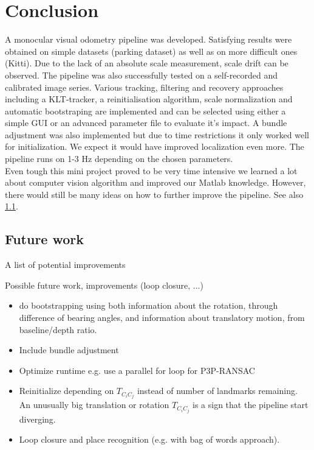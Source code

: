 \section{Conclusion}
A monocular visual odometry pipeline was developed. Satisfying results were obtained on simple datasets (parking dataset) as well as on more difficult ones (Kitti). Due to the lack of an absolute scale measurement, scale drift can be observed. The pipeline was also successfully tested on a self-recorded and calibrated image series. Various tracking, filtering and recovery approaches including a KLT-tracker, a reinitialisation algorithm, scale normalization and automatic bootstraping are implemented and can be selected using either a simple GUI or an advanced parameter file to evaluate it's impact. A bundle adjustment was also implemented but due to time restrictions it only worked well for initialization. We expect it would have improved localization even more. The pipeline runs on 1-3 Hz depending on the chosen parameters.\\

Even tough this mini project proved to be very time intensive we learned a lot about computer vision algorithm and improved our Matlab knowledge. However, there would still be many ideas on how to further improve the pipeline. See also \cref{future}.

\subsection{Future work}\label{future}
A list of potential improvements

Possible future work, improvements (loop closure, ...)

\begin{itemize}
\item do bootstrapping using both information about the rotation, through difference of bearing angles, and information about translatory motion, from baseline/depth ratio.
\item Include bundle adjustment
\item Optimize runtime e.g. use a parallel for loop for P3P-RANSAC
\item Reinitialize depending on $T_{C_iC_j}$ instead of number of landmarks remaining. An unusually big translation or rotation $T_{C_iC_j}$ is a sign that the pipeline start diverging.
\item Loop closure and place recognition (e.g. with bag of words approach).
\end{itemize}